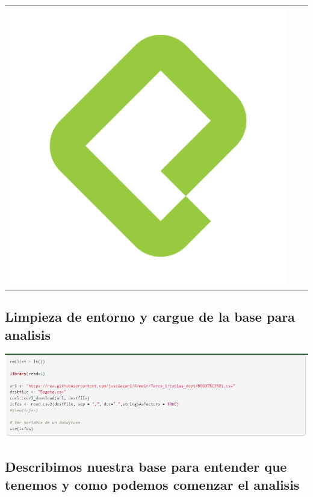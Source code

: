 \documentclass{article}
\begin{document}
\begin{center}
\begin{tabular}{c c c}
\includegraphics[scale=0.2]{platzi.png} \\
\end{tabular}
\end{center}
\newpage

\subsection{Limpieza de entorno y cargue de la base para analisis}

\begin{center}
\includegraphics[scale=0.5]{Captura.PNG} 
\end{center}

\subsection{Describimos nuestra base para entender que tenemos y como podemos comenzar el analisis}
\end{document}
